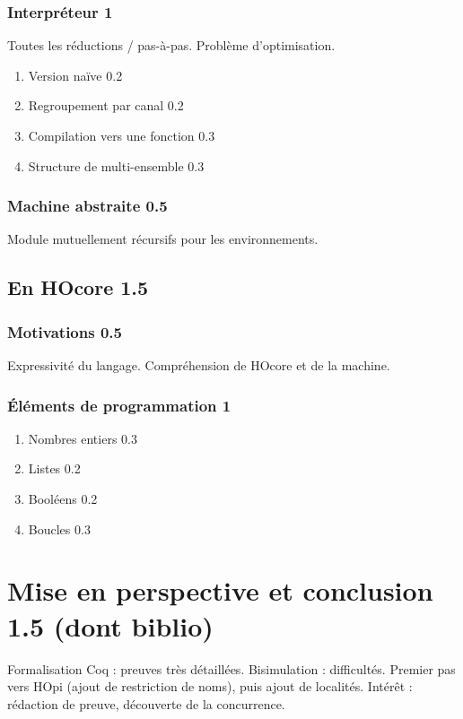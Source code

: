 \documentclass[11pt]{article}
\newcounter{c_theo}
\newcounter{c_def}
\begin{document}
\subsubsection{Interpréteur 1}
\label{sec-4-1-1}
Toutes les réductions / pas-à-pas.
Problème d'optimisation.
\begin{enumerate}
\item Version naïve 0.2
\label{sec-4-1-1-1}
\item Regroupement par canal 0.2
\label{sec-4-1-1-2}
\item Compilation vers une fonction 0.3
\label{sec-4-1-1-3}
\item Structure de multi-ensemble 0.3
\label{sec-4-1-1-4}
\end{enumerate}
\subsubsection{Machine abstraite 0.5}
\label{sec-4-1-2}
Module mutuellement récursifs pour les environnements.
\subsection{En HOcore 1.5}
\label{sec-4-2}
\subsubsection{Motivations 0.5}
\label{sec-4-2-1}
Expressivité du langage.
Compréhension de HOcore et de la machine.
\subsubsection{Éléments de programmation 1}
\label{sec-4-2-2}
\begin{enumerate}
\item Nombres entiers 0.3
\label{sec-4-2-2-1}
\item Listes 0.2
\label{sec-4-2-2-2}
\item Booléens 0.2
\label{sec-4-2-2-3}
\item Boucles 0.3
\label{sec-4-2-2-4}
\end{enumerate}


\section{Mise en perspective et conclusion 1.5 (dont biblio)}
\label{sec-5}
Formalisation Coq : preuves très détaillées.
Bisimulation : difficultés.
Premier pas vers HOpi (ajout de restriction de noms), puis ajout de localités.
Intérêt : rédaction de preuve, découverte de la concurrence.




\end{document}

